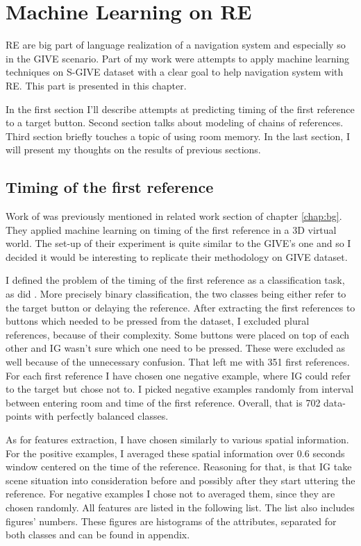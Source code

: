 \chapter{Machine Learning on RE}
RE are big part of language realization of a navigation system and especially so in the GIVE scenario. Part of my work were attempts to apply machine learning techniques on S-GIVE dataset with a clear goal to help navigation system with RE. This part is presented in this chapter.

In the first section I'll describe attempts at predicting timing of the first reference to a target button. Second section talks about modeling of chains of references. Third section briefly touches a topic of using room memory. In the last section, I will present my thoughts on the results of previous sections.

\section{Timing of the first reference}
\label{sec:timing-firsref-ml}
Work of \citet{stoia2006sentence} was previously mentioned in related work section of chapter \ref{chap:bg}. They applied machine learning on timing of the first reference in a 3D virtual world. The set-up of their experiment is quite similar to the GIVE's one and so I decided it would be interesting to replicate their methodology on GIVE dataset. 

I defined the problem of the timing of the first reference as a classification task, as did \citet{stoia2006sentence}. More precisely binary classification, the two classes being either refer to the target button or delaying the reference. After extracting the first references to buttons which needed to be pressed from the dataset, I excluded plural references, because of their complexity. Some buttons were placed on top of each other and IG wasn't sure which one need to be pressed. These were excluded as well because of the unnecessary confusion. That left me with 351 first references. For each first reference I have chosen one negative example, where IG could refer to the target but chose not to. I picked negative examples randomly from interval between entering room and time of the first reference. Overall, that is 702 data-points with perfectly balanced classes.

As for features extraction, I have chosen similarly to \citet{stoia2006sentence} various spatial information. For the positive examples, I averaged these spatial information over 0.6 seconds window centered on the time of the reference. Reasoning for that, is that IG take scene situation into consideration before and possibly after they start uttering the reference. For negative examples I chose not to averaged them, since they are chosen randomly. All features are listed in the following list. The list also includes figures' numbers. These figures are histograms of the attributes, separated for both classes and can be found in appendix.

